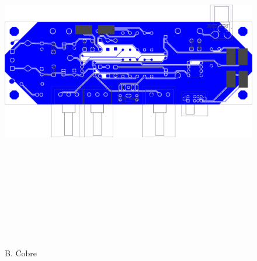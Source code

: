 \begin{figure}[H]
    \centering
    \includegraphics[height=150mm, angle=90]{img/PCB/layers/preamp/bottom-copper.png}
    \caption\footnotesize{{B. Cobre}}
    \label{fig:pcb_preamp_bottom_copper}
\end{figure}

\clearpage

